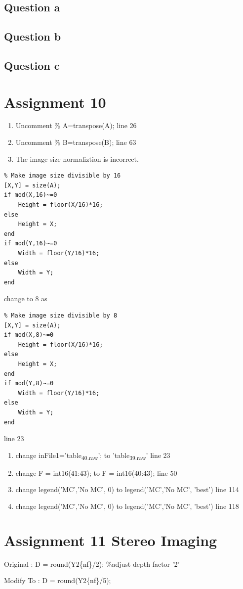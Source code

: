 \documentclass[titlepage]{article}
\begin{document}
\subsection{Question a}
\label{sec:orgf50108c}

\subsection{Question b}
\label{sec:org963d6bd}
\subsection{Question c}
\label{sec:org3cf9e8e}


\section{Assignment 10}
\label{sec:org2622ac6}

\begin{enumerate}
\item Uncomment \% A=transpose(A);  line 26
\item Uncomment \% B=transpose(B);  line 63
\item The image size normaliztion is incorrect.
\end{enumerate}
\begin{verbatim}
% Make image size divisible by 16
[X,Y] = size(A);
if mod(X,16)~=0
    Height = floor(X/16)*16;
else
    Height = X;
end
if mod(Y,16)~=0
    Width = floor(Y/16)*16;
else
    Width = Y;
end
\end{verbatim}

change to 8 as

\begin{verbatim}
% Make image size divisible by 8
[X,Y] = size(A);
if mod(X,8)~=0
    Height = floor(X/16)*16;
else
    Height = X;
end
if mod(Y,8)~=0
    Width = floor(Y/16)*16;
else
    Width = Y;
end

\end{verbatim}

line 23

\begin{enumerate}
\item change inFile1='table\textsubscript{40.raw}'; to 'table\textsubscript{39.raw}' line 23
\item change F = int16(41:43); to F = int16(40:43); line 50
\item change legend('MC','No MC', 0) to legend('MC','No MC', 'best') line 114
\item change legend('MC','No MC', 0) to legend('MC','No MC', 'best') line 118
\end{enumerate}



\section{Assignment 11 Stereo Imaging}
\label{sec:org23cdbc8}

Original : D = round(Y2\{nf\}/2);  \%adjust depth factor '2'

Modify To : D = round(Y2\{nf\}/5);
\end{document}
